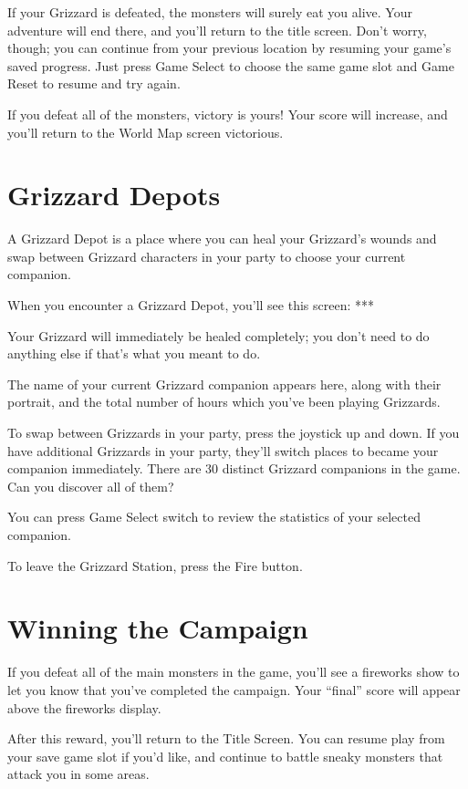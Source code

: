 \documentclass[12pt,twoside]{memoir}
\begin{document}
If your  Grizzard is defeated, the  monsters will surely eat  you alive.
Your adventure  will end there, and  you'll return to the  title screen.
Don't worry,  though; you  can continue from  your previous  location by
resuming your  game's saved progress.  Just press Game Select  to choose
the same game slot and Game Reset to resume and try again.

If you defeat all of the monsters, victory is yours! Your score will
increase, and you'll return to the World Map screen victorious.



\section{Grizzard Depots}\label{Grizzard Depots}

A Grizzard  Depot is a place  where you can heal  your Grizzard's wounds
and  swap between  Grizzard  characters  in your  party  to choose  your
current companion.

When you encounter a Grizzard Depot, you'll see this screen: ***

Your Grizzard will  immediately be healed completely; you  don't need to
do anything else if that's what you meant to do.

The name  of your  current Grizzard companion  appears here,  along with
their  portrait,  and  the  total  number of  hours  which  you've  been
playing Grizzards.

To swap between Grizzards in your party, press the joystick up and down.
If you have additional Grizzards in your party, they'll switch places to
became  your  companion  immediately.  There are  30  distinct  Grizzard
companions in the game. Can you discover all of them?

You  can press  Game  Select switch  to review  the  statistics of  your
selected companion.

To leave the Grizzard Station, press the Fire button.


\section{Winning the Campaign}\label{Winning the Campaign}

If  you  defeat  all of  the  main  monsters  in  the game,  you'll  see
a fireworks  show to let  you know  that you've completed  the campaign.
Your ``final'' score will appear above the fireworks display.

After this  reward, you'll return  to the  Title Screen. You  can resume
play from  your save  game slot  if you'd like,  and continue  to battle
sneaky monsters that attack you in some areas.
\end{document}
